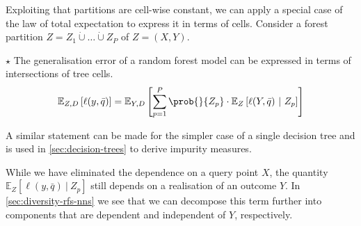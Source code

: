 \documentclass[../main.tex]{subfiles}
\begin{document}
Exploiting that partitions are cell-wise constant, we can apply a special case of the law of total expectation to express it in terms of cells.
Consider a forest partition $Z = Z_{1} \dot\cup \dots \dot\cup Z_{P}$ of $Z=(X,Y)$. 
\begin{proposition} 
   \label{thm:random-forest-structure} 
    $\star$ The generalisation error of a random forest model can be expressed in terms of intersections of tree cells.
$$
\mathbb{E}_{Z,D}\left[ \ell(y,\bar{q}) \right] = \mathbb{E}_{Y,D}\left[ \sum_{p=1}^P \prob{}{Z_{p}} \cdot \mathbb{E}_{Z}\left[ \ell(Y, \bar{q}) ~|~Z_{p}\right]   \right] 
$$
\end{proposition} 
A similar statement can be made for the simpler case of a single decision tree and is used in \cref{sec:decision-trees} to derive impurity measures.

While we have eliminated the dependence on a query point $X$, the quantity $\mathbb{E}_{Z}\left[ \ell(y, \bar{q}) ~|~Z_{p}\right]$ still depends on a realisation of an outcome $Y$. In \cref{sec:diversity-rfs-nns} we see that we can decompose this term further into components that are dependent and independent of $Y$, respectively.
\end{document}
